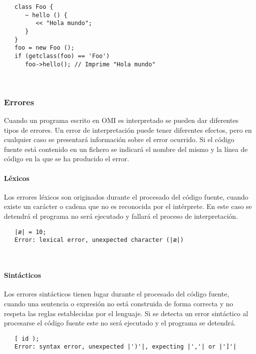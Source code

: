 \begin{lstlisting}
   class Foo {
      ~ hello () {
         << "Hola mundo";
      }
   }
   foo = new Foo ();
   if (getclass(foo) == 'Foo')
      foo->hello(); // Imprime "Hola mundo"
\end{lstlisting}
\hfill\\ 

\subsubsection{Errores} \label{sec:error}
Cuando un programa escrito en OMI es interpretado se pueden dar diferentes tipos de errores. Un error de interpretación 
puede tener diferentes efectos, pero en cualquier caso se presentará información sobre el error ocurrido. Si el código fuente está contenido en un fichero 
se indicará el nombre del mismo y la línea de código en la que se ha producido el error. 

\paragraph {Léxicos} 
Los errores léxicos son originados durante el procesado del código fuente, cuando existe un carácter o cadena que no es reconocida por el intérprete. En este caso 
se detendrá el programa no será ejecutado y fallará el proceso de interpretación. \\

\begin{lstlisting}
   |æ| = 10;
   Error: lexical error, unexpected character (|æ|)
\end{lstlisting}
\hfill\\ 

\paragraph {Sintácticos}
Los errores sintácticos tienen lugar durante el procesado del código fuente, cuando una sentencia o expresión no está construida de forma correcta y no respeta las reglas establecidas por el 
lenguaje. Si se detecta un error sintáctico al procesarse el código fuente este no será ejecutado y el programa se detendrá. \\

\begin{lstlisting}
   [ id );
   Error: syntax error, unexpected |')'|, expecting |','| or |']'|
\end{lstlisting}
\hfill\\ 

